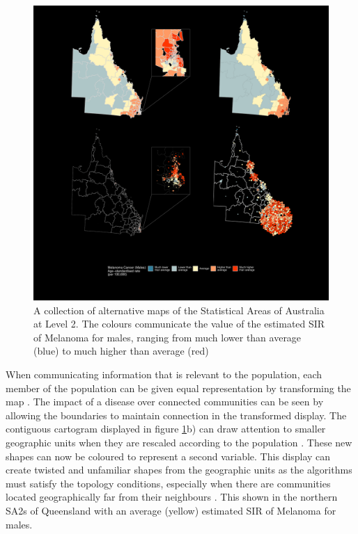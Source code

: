 \documentclass{monashthesis}
\begin{document}
\begin{figure}[H]
\centering
\includegraphics[width=14cm]{figures/03-algorithm/qld_grid.pdf}
\caption{\label{fig:qld_grid}A collection of alternative maps of the Statistical Areas of Australia at Level 2. The colours communicate the value of the estimated SIR of Melanoma for males, ranging from much lower than average (blue) to much higher than average (red)}
\end{figure}

When communicating information that is relevant to the population, each member of the population can be given equal representation by transforming the map \autocite{TVSSS}.
The impact of a disease over connected communities can be seen by allowing the boundaries to maintain connection in the transformed display. The contiguous cartogram displayed in figure \ref{fig:qld_grid}b) can draw attention to smaller geographic units when they are rescaled according to the population \autocite{DMAHP}. These new shapes can now be coloured to represent a second variable. This display can create twisted and unfamiliar shapes from the geographic units as the algorithms must satisfy the topology conditions, especially when there are communities located geographically far from their neighbours \autocite{TVSSS}. This shown in the northern SA2s of Queensland with an average (yellow) estimated SIR of Melanoma for males.
\end{document}
